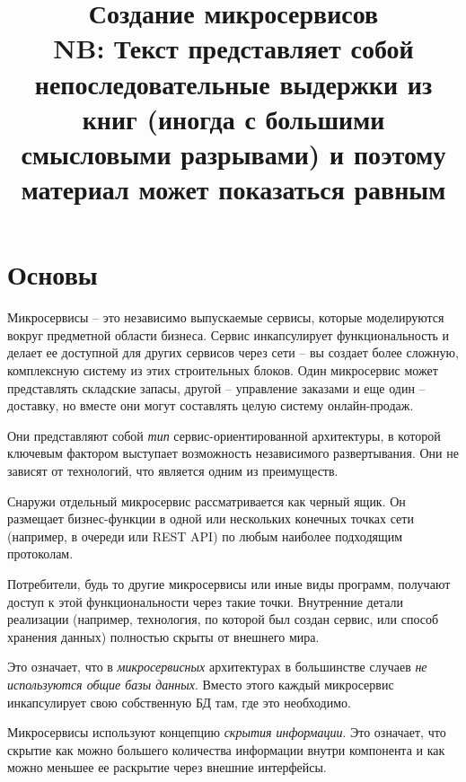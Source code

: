 \documentclass[%
	11pt,
	a4paper,
	utf8,
		]{article}
\begin{document}
\title{Создание микросервисов\\{\normalsize\color{red}NB: Текст представляет собой непоследовательные выдержки из книг (иногда с большими смысловыми разрывами) и поэтому материал может показаться равным}}


\author{}

\date{}
\maketitle

\thispagestyle{fancy}

\tableofcontents

\section{Основы}

Микросервисы -- это независимо выпускаемые сервисы, которые моделируются вокруг предметной области бизнеса. Сервис инкапсулирует функциональность и делает ее доступной для других сервисов через сети -- вы создает более сложную, комплексную систему из этих строительных блоков. Один микросервис может представлять складские запасы, другой -- управление заказами и еще один -- доставку, но вместе они могут составлять целую систему онлайн-продаж.

Они представляют собой \emph{тип} сервис-ориентированной архитектуры, в которой ключевым фактором выступает возможность независимого развертывания. Они не зависят от технологий, что является одним из преимуществ.

Снаружи отдельный микросервис рассматривается как черный ящик. Он размещает бизнес-функции в одной или нескольких конечных точках сети (например, в очереди или REST API) по любым наиболее подходящим протоколам.

Потребители, будь то другие микросервисы или иные виды программ, получают доступ к этой функциональности через такие точки. Внутренние детали реализации (например, технология, по которой был создан сервис, или способ хранения данных) полностью скрыты от внешнего мира.

Это означает, что в \emph{микросервисных} архитектурах в большинстве случаев \emph{не используются общие базы данных}. Вместо этого каждый микросервис инкапсулирует свою собственную БД там, где это необходимо.

Микросервисы используют концепцию \emph{скрытия информации}. Это означает, что скрытие как можно большего количества информации внутри компонента и как можно меньшее ее раскрытие через внешние интерфейсы. 
\end{document}
